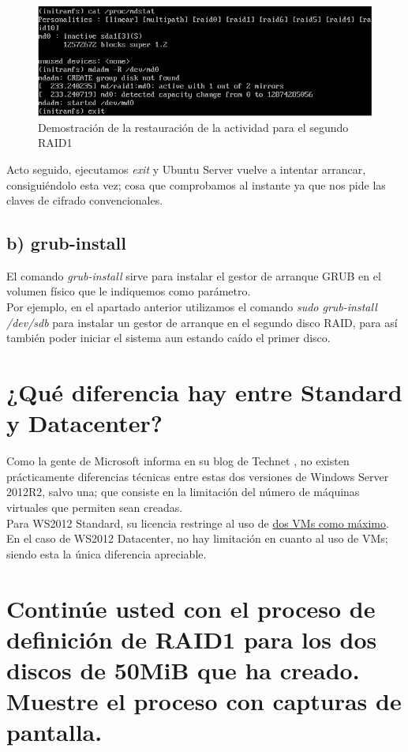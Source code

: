 \begin{figure}[H]
	\centering
	\includegraphics[scale=0.8]{mdstat-inactive}
	\caption{Demostración de la restauración de la actividad para el segundo RAID1} \label{fig:figura2}
\end{figure}

Acto seguido, ejecutamos \emph{exit} y Ubuntu Server vuelve a intentar arrancar, consiguiéndolo esta vez; cosa que comprobamos al instante ya que
nos pide las claves de cifrado convencionales.


\subsection{b) grub-install}
El comando \emph{grub-install} sirve para instalar el gestor de arranque GRUB en el volumen físico que le indiquemos como parámetro. \\
Por ejemplo, en el apartado anterior utilizamos el comando \emph{sudo grub-install /dev/sdb} para instalar un gestor de arranque en el
segundo disco RAID, para así también poder iniciar el sistema aun estando caído el primer disco.


\section{¿Qué diferencia hay entre Standard y Datacenter?}
Como la gente de Microsoft informa en su blog de Technet \cite{ws2012-versions}, no existen prácticamente diferencias técnicas entre estas dos 
versiones de Windows Server 2012R2, salvo una; que consiste en la limitación del número de máquinas virtuales que permiten sean creadas. \\
Para WS2012 Standard, su licencia restringe al uso de \underline{dos VMs como máximo}. En el caso de WS2012 Datacenter, no hay limitación en 
cuanto al uso de VMs; siendo esta la única diferencia apreciable.

\section{Continúe usted con el proceso de definición de RAID1 para los dos discos de 50MiB que ha creado. Muestre el proceso con
capturas de pantalla.}

